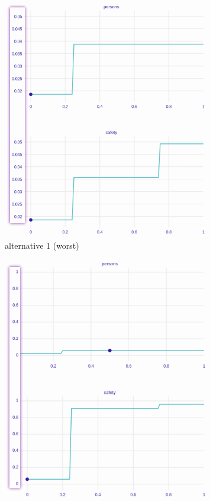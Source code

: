 \documentclass[../main.tex]{subfiles}
\begin{document}
\begin{figure}[H]
	\centering
	\begin{subfigure}[b]{0.32\linewidth}
		\includegraphics[width=\linewidth]{../img/xgb-cetpar-worst.png}
		\caption{alternative 1 (worst)}
		\label{fig:xgb-3alt1-cetpar}
	\end{subfigure}
	\begin{subfigure}[b]{0.32\linewidth}
		\includegraphics[width=\linewidth]{../img/xgb-cetpar-mid.png}

\end{subfigure}
\end{figure}
\end{document}
